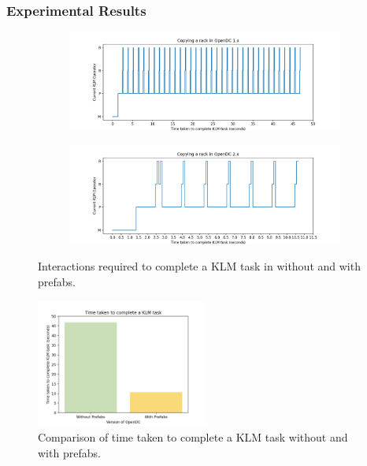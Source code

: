 \documentclass[11pt]{article}
\begin{document}
		\subsubsection{Experimental Results}
			\begin{figure}
				\centering	
				\begin{subfigure}[b]{\textwidth}
					\centering
					\includegraphics[width=\textwidth]{results/opendc1.png}
					\caption{\label{fig:opendcklm1}}
				\end{subfigure}
				\vfill
				\begin{subfigure}[b]{\textwidth}
					\centering
					\includegraphics[width=\textwidth]{results/opendc2.png}
					\caption{\label{fig:opendcklm2}}
				\end{subfigure}
				\caption[Interactions required to complete a KLM task in two variants of \opendc{}]{Interactions required to complete a KLM task in \opendc{} without and with prefabs.}
				\label{fig:opendcklm}
			\end{figure}
			\begin{figure}[]
				\centering
				\includegraphics[width=0.5\textwidth]{results/klmbarcharts.png}
				\caption[Time taken to complete a KLM task in two variants of \opendc{}]{Comparison of time taken to complete a KLM task without and with prefabs.}
				\label{fig:opendcbarchart}
			\end{figure}
\end{document}
